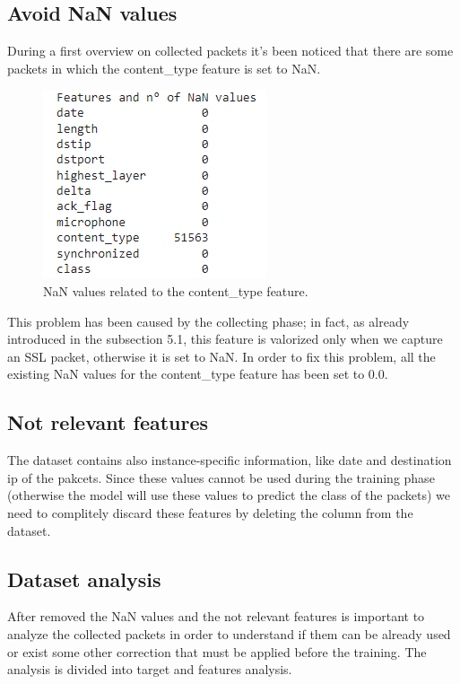 \documentclass[sigconf]{acmart}
\begin{document}
	\subsection{Avoid NaN values}
	During a first overview on collected packets it's been noticed that there are some packets in which the content\_type feature is set to NaN.
	  \begin{figure}[h!]
            \includegraphics[width=0.8\linewidth]{img/nan_values.png}
            \caption{NaN values related to the content\_type feature.}
            \label{fig:nan_values}
        \end{figure}
	This problem has been caused by the collecting phase; in fact, as already introduced in the subsection 5.1, this feature is valorized only when we capture an SSL packet, otherwise it is set to NaN. In order to fix this problem, all the existing NaN values for the content\_type feature has been set to 0.0.
	\subsection{Not relevant features}
	The dataset contains also instance-specific information, like date and destination ip of the pakcets. Since these values cannot be used during the training phase (otherwise the model will use these values to predict the class of the packets) we need to complitely discard these features by deleting the column from the dataset.
	\subsection{Dataset analysis}
	After removed the NaN values and the not relevant features is important to analyze the collected packets in order to understand if them can be already used or exist some other correction that must be applied before the training. The analysis is divided into target and features analysis.
\end{document}
